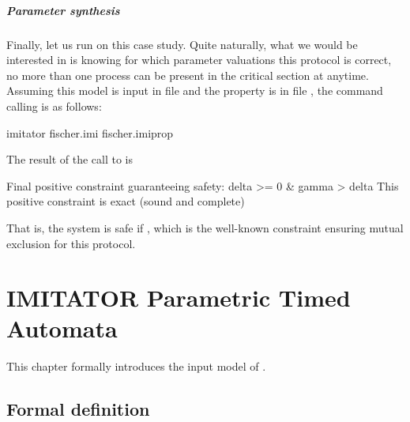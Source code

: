 \paragraph{Parameter synthesis}
Finally, let us run \imitator{} on this case study.
Quite naturally, what we would be interested in is knowing for which parameter valuations this protocol is correct, \ie{} no more than one process can be present in the critical section at anytime.
Assuming this model is input in file  and the property is in file , the command calling \imitator{} is as follows:



\begin{terminal}
imitator fischer.imi fischer.imiprop
\end{terminal}

The result of the call to \imitator{} is

\begin{terminaloutput}
Final positive constraint guaranteeing safety:
delta >= 0
& gamma > delta
This positive constraint is exact (sound and complete)
\end{terminaloutput}

That is, the system is safe if , which is the well-known constraint ensuring mutual exclusion for this protocol.




\chapter{IMITATOR Parametric Timed Automata}\label{section:IPTA}


This chapter formally introduces the input model of \imitator{}.

\section{Formal definition}\label{section:NIPTA}

